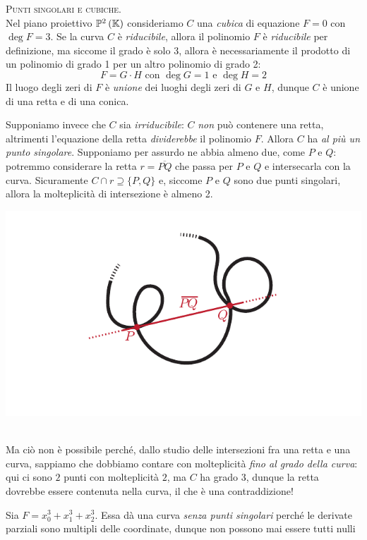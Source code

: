 \begin{observe}\textsc{Punti singolari e cubiche.}\\
	Nel piano proiettivo $\proj[2]{\kamp}$ consideriamo $C$ una \textit{cubica} di equazione $F=0$ con $\deg F=3$. Se la curva $C$ è \textit{riducibile}, allora il polinomio $F$ è \textit{riducibile} per definizione, ma siccome il grado è solo 3, allora è necessariamente il prodotto di un polinomio di grado 1 per un altro polinomio di grado 2:
	\begin{equation*}
		F=G\cdot H\text{ con }\deg G=1\text{ e }\deg H=2
	\end{equation*}
	Il luogo degli zeri di $F$ è \textit{unione} dei luoghi degli zeri di $G$ e $H$, dunque $C$ è unione di una retta e di una conica.\\ \hspace{-1mm}
	\begin{minipage}{0.75\textwidth}
	\vspace{2mm}
	Supponiamo invece che $C$ sia \textit{irriducibile}: $C$ \textit{non} può contenere una retta, altrimenti l'equazione della retta \textit{dividerebbe} il polinomio $F$. Allora $C$ ha \textit{al più un punto singolare}.
	Supponiamo per assurdo ne abbia almeno due, come $P$ e $Q$: potremmo considerare la retta $r=\overline{PQ}$ che passa per $P$ e $Q$ e intersecarla con la curva. Sicuramente $C\cap r\supseteq \{P,Q\}$ e, siccome $P$ e $Q$ sono due punti singolari, allora la molteplicità di intersezione è almeno 2.
	\end{minipage}
	\hspace{-12mm}
	\begin{minipage}{0.24\textwidth}
		\includegraphics[trim=0cm 0cm 0cm 0cm,clip,scale=0.50]{images/planecurve5.pdf}
	\end{minipage}\\
	Ma ciò non è possibile perché, dallo studio delle intersezioni fra una retta e una curva, sappiamo che dobbiamo contare con molteplicità \textit{fino al grado della curva}: qui ci sono $2$ punti con molteplicità $2$, ma $C$ ha grado 3, dunque la retta dovrebbe essere contenuta nella curva, il che è una contraddizione!
\end{observe}
\begin{example}
	Sia $F=x_0^3+x_1^3+x_2^3$. Essa dà una curva \textit{senza punti singolari} perché le derivate parziali sono multipli delle coordinate, dunque non possono mai essere tutti nulli
\end{example}

